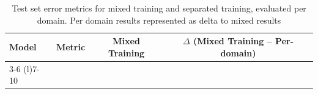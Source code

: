             
            \begin{table}[h]
            \centering
            \caption{Test set error metrics for mixed training and separated training, evaluated per domain. Per domain results represented as delta to mixed results}
            \label{tab:results_exp1_exp2_merged_deltas}
            \setlength{\tabcolsep}{3pt} %
            
            \begin{tabular}{llrrrrrrrr}
            \toprule
            \textbf{Model} & \textbf{Metric} & 
            \multicolumn{4}{c}{\textbf{Mixed Training}} & 
            \multicolumn{4}{c}{\textbf{$\Delta$ (Mixed Training -- Per-domain)}} \\
            \cmidrule(l){3-6} \cmidrule(l){7-10}
            

\end{tabular}
\end{table}
